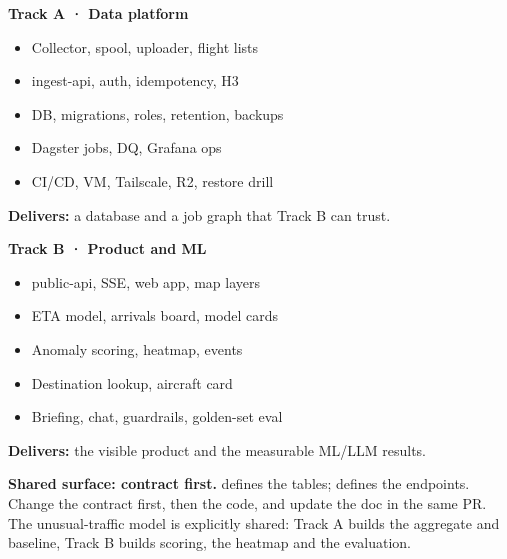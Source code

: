 \documentclass[10.5pt]{article}
\begin{document}
\vspace{2pt}
\begin{minipage}[t]{0.48\linewidth}
\begin{accentcard}
{\bfseries Track A · Data platform}
\begin{itemize}[leftmargin=1.05em,itemsep=2pt,topsep=2pt]
  \item Collector, spool, uploader, flight lists
  \item ingest-api, auth, idempotency, H3
  \item DB, migrations, roles, retention, backups
  \item Dagster jobs, DQ, Grafana ops
  \item CI/CD, VM, Tailscale, R2, restore drill
\end{itemize}
\vspace{2pt}
{\small\textbf{Delivers:} a database and a job graph that Track B can trust.}
\end{accentcard}
\end{minipage}\hfill
\begin{minipage}[t]{0.48\linewidth}
\begin{violetcard}
{\bfseries Track B · Product and ML}
\begin{itemize}[leftmargin=1.05em,itemsep=2pt,topsep=2pt]
  \item public-api, SSE, web app, map layers
  \item ETA model, arrivals board, model cards
  \item Anomaly scoring, heatmap, events
  \item Destination lookup, aircraft card
  \item Briefing, chat, guardrails, golden-set eval
\end{itemize}
\vspace{2pt}
{\small\textbf{Delivers:} the visible product and the measurable ML/LLM results.}
\end{violetcard}
\end{minipage}

\vspace{4pt}
\begin{softcard}
{\bfseries Shared surface: contract first.}  defines the tables;  defines the endpoints. Change the contract first, then the code, and update the doc in the same PR. The unusual-traffic model is explicitly shared: Track A builds the aggregate and baseline, Track B builds scoring, the heatmap and the evaluation.
\end{softcard}
\end{document}
